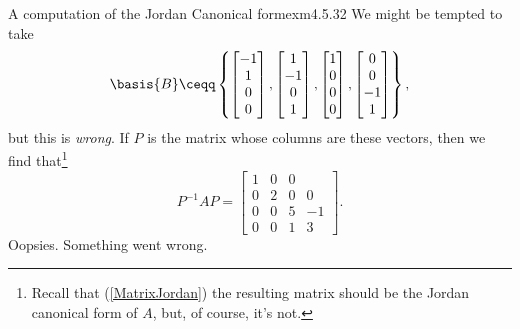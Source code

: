 \begin{exm}{A computation of the Jordan Canonical form}{exm4.5.32}
	We might be tempted to take
	\begin{equation}
		\basis{B}\ceqq \left\{ \begin{bmatrix}-1 \\ 1 \\ 0 \\ 0\end{bmatrix},\begin{bmatrix}1 \\ -1 \\ 0 \\ 1\end{bmatrix},\begin{bmatrix}1 \\ 0 \\ 0 \\ 0\end{bmatrix},\begin{bmatrix}0 \\ 0 \\ -1 \\ 1\end{bmatrix}\right\} ,
	\end{equation}
	but this is \emph{wrong}.  If $P$ is the matrix whose columns are these vectors, then we find that\footnote{Recall that (\cref{MatrixJordan}) the resulting matrix should be the Jordan canonical form of $A$, but, of course, it's not.}
	\begin{equation}
		P^{-1}AP=\begin{bmatrix}1 & 0 & 0 \\ 0 & 2 & 0 & 0 \\ 0 & 0 & 5 & -1 \\ 0 & 0 & 1 & 3\end{bmatrix}.
	\end{equation}
	Oopsies.  Something went wrong.
	

\end{exm}
